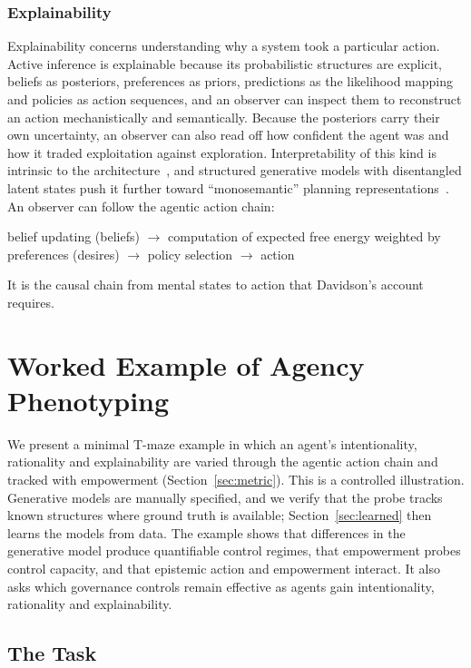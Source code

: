 \documentclass[letterpaper]{article} %
\theoremstyle{definition}
\begin{document}
\subsubsection{Explainability}
Explainability concerns understanding why a system took a particular action. Active inference is explainable because its probabilistic structures are explicit, beliefs as posteriors, preferences as priors, predictions as the likelihood mapping and policies as action sequences, and an observer can inspect them to reconstruct an action mechanistically and semantically. Because the posteriors carry their own uncertainty, an observer can also read off how confident the agent was and how it traded exploitation against exploration. Interpretability of this kind is intrinsic to the architecture~\citep{albarracinVariationalApproachScripts2021}, and structured generative models with disentangled latent states push it further toward ``monosemantic'' planning representations~\citep{brickenMonosemanticity2023}. An observer can follow the agentic action chain:

\begin{center}
belief updating (beliefs) $\to$ computation of expected free energy weighted by preferences (desires) $\to$ policy selection $\to$ action
\end{center}

It is the causal chain from mental states to action that Davidson's account requires.

\section{Worked Example of Agency Phenotyping}\label{sec:worked}

We present a minimal T-maze example in which an agent's intentionality, rationality and explainability are varied through the agentic action chain and tracked with empowerment (Section~\ref{sec:metric}). This is a controlled illustration. Generative models are manually specified, and we verify that the probe tracks known structures where ground truth is available; Section~\ref{sec:learned} then learns the models from data. The example shows that differences in the generative model produce quantifiable control regimes, that empowerment probes control capacity, and that epistemic action and empowerment interact. It also asks which governance controls remain effective as agents gain intentionality, rationality and explainability.

\subsection{The Task}
\end{document}
